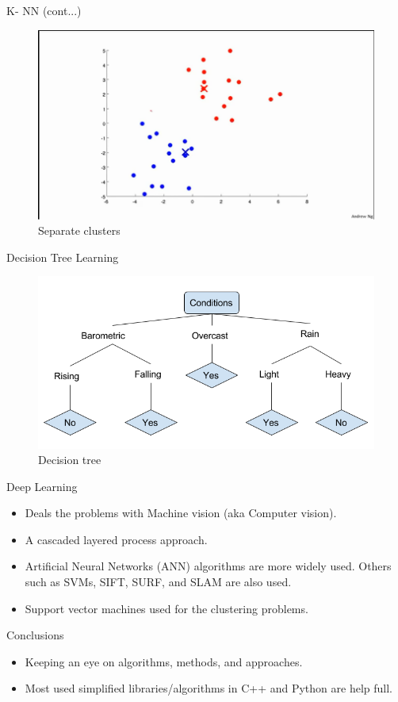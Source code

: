 \documentclass{beamer}
\begin{document}
\begin{frame}{K- NN (cont...)}
    \begin{figure}
        \centering
        \includegraphics[width=.8\textwidth]{fig/k6.png}
        \caption{Separate clusters}
        \label{fig:Separate clusters}
    \end{figure}
\end{frame}
\begin{frame}{Decision Tree Learning}
    \begin{figure}
        \centering
        \includegraphics[width=.8\textwidth]{decision-tree-diagram.png}
        \caption{Decision tree}
        \label{fig:Decision tree}
    \end{figure}
\end{frame}
\begin{frame}{Deep Learning}
    \begin{itemize}
        \item Deals the problems with Machine vision (aka Computer vision).
        \item A cascaded layered process approach.
        \item Artificial Neural Networks (ANN) algorithms are more widely used. Others such as SVMs, SIFT, SURF, and SLAM are also used.
        \item Support vector machines used for the clustering problems.
    \end{itemize}
\end{frame}
\begin{frame}{Conclusions}
    \begin{itemize}
    \item Keeping an eye on algorithms, methods, and approaches.
    \item Most used simplified libraries/algorithms in C++ and Python are help full.
    \end{itemize}
\end{frame}
\end{document}
